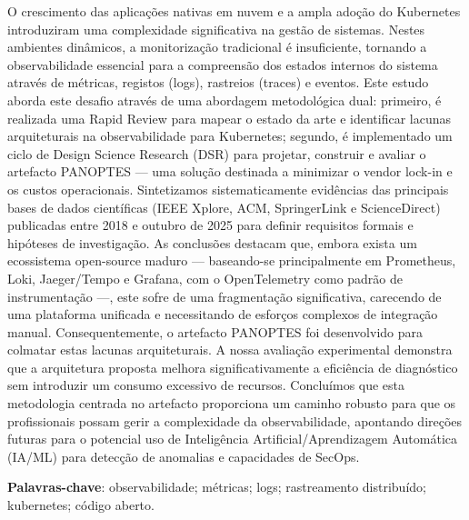 \begin{resumo}[Resumo]
O crescimento das aplicações nativas em nuvem e a ampla adoção do Kubernetes introduziram uma complexidade significativa na gestão de sistemas. Nestes ambientes dinâmicos, a monitorização tradicional é insuficiente, tornando a observabilidade essencial para a compreensão dos estados internos do sistema através de métricas, registos (logs), rastreios (traces) e eventos. Este estudo aborda este desafio através de uma abordagem metodológica dual: primeiro, é realizada uma Rapid Review para mapear o estado da arte e identificar lacunas arquiteturais na observabilidade para Kubernetes; segundo, é implementado um ciclo de Design Science Research (DSR) para projetar, construir e avaliar o artefacto PANOPTES — uma solução destinada a minimizar o vendor lock-in e os custos operacionais. Sintetizamos sistematicamente evidências das principais bases de dados científicas (IEEE Xplore, ACM, SpringerLink e ScienceDirect) publicadas entre 2018 e outubro de 2025 para definir requisitos formais e hipóteses de investigação. As conclusões destacam que, embora exista um ecossistema open-source maduro — baseando-se principalmente em Prometheus, Loki, Jaeger/Tempo e Grafana, com o OpenTelemetry como padrão de instrumentação —, este sofre de uma fragmentação significativa, carecendo de uma plataforma unificada e necessitando de esforços complexos de integração manual. Consequentemente, o artefacto PANOPTES foi desenvolvido para colmatar estas lacunas arquiteturais. A nossa avaliação experimental demonstra que a arquitetura proposta melhora significativamente a eficiência de diagnóstico sem introduzir um consumo excessivo de recursos. Concluímos que esta metodologia centrada no artefacto proporciona um caminho robusto para que os profissionais possam gerir a complexidade da observabilidade, apontando direções futuras para o potencial uso de Inteligência Artificial/Aprendizagem Automática (IA/ML) para detecção de anomalias e capacidades de SecOps.

\vspace{\onelineskip}

\noindent
\textbf{Palavras-chave}: observabilidade; métricas; logs; rastreamento distribuído; kubernetes; código aberto.
\end{resumo}
